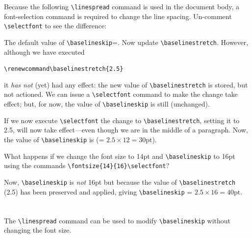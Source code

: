 \documentclass{article}
\begin{document}
	\blindtext[1] %
	Because the following \verb|\linespread| command is used in the document body, a font-selection command is required to change the line spacing. Un-comment \verb|\selectfont| to see the difference:
	
	\linespread{2.5}%
	
	\blindtext[1]
	The default value of \verb|\baselineskip|=\the\baselineskip. Now update \verb|\baselinestretch|\renewcommand\baselinestretch{2.5}. However, although we have executed
	
	\vspace{5pt}
	\verb|\renewcommand\baselinestretch{2.5}| 
	\vspace{5pt}
	
	\noindent it \textit{has not} (yet) had any effect: the new value of \verb|\baselinestretch| is stored, but not actioned. We can issue a \verb|\selectfont| command to make the change take effect; but, for now, the value of \verb|\baselineskip| is still \the\baselineskip{} (unchanged). 
	
	If we now execute \verb|\selectfont| the change to \verb|\baselinestretch|, setting it to 2.5, will now take effect---\selectfont even though we are in the middle of a paragraph. Now, the value of \verb|\baselineskip| is \the\baselineskip{} (= \(2.5 \times 12=30\mathrm{pt}\)).
	
	What happens if we change the font size to 14pt and \verb|\baselineskip| to 16pt using the commands \verb|\fontsize{14}{16}\selectfont|? 
	
	\fontsize{14}{16}\selectfont Now, \verb|\baselineskip| is \textit{not} 16pt but \the\baselineskip{} because the value of  \verb|\baselinestretch| (2.5) has been preserved and applied, giving \verb|\baselineskip| = \(2.5 \times 16=40\mathrm{pt}\).
	
	\section{\texttt{\bfseries\string\linespread}}
	The \verb|\linespread| command can be used to modify \verb|\baselineskip| without changing the font size.
	\newcommand{\doublespacing}{%
		\setstretch {1.667}%
		\ifcase \@ptsize \relax %
		\setstretch {1.667}%
		\or %
		\setstretch {1.618}%
		\or %
		\setstretch {1.655}%
		\fi
	}
	
	
\end{document}
